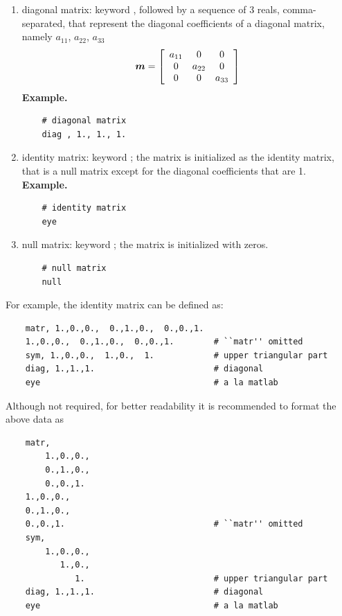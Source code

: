 \begin{enumerate}
    \item diagonal matrix: keyword , followed by a sequence
    of 3 reals, comma-separated, that represent the diagonal coefficients 
    of a diagonal matrix, namely $a_{11}$, $a_{22}$, $a_{33}$
\begin{equation}
	\T{m} = \sqbr{\matr{ccc}{
		a_{11} & 0 & 0 \\
		0 & a_{22} & 0 \\
		0 & 0 & a_{33}
	}}
\end{equation}
\textbf{Example.}
\begin{verbatim}
    # diagonal matrix
    diag , 1., 1., 1.
\end{verbatim}

    \item identity matrix: keyword ; the matrix is initialized
    as the identity matrix, that is a null matrix except for the diagonal 
    coefficients that are 1.
\textbf{Example.}
\begin{verbatim}
    # identity matrix
    eye
\end{verbatim}

    \item null matrix: keyword ; the matrix is initialized 
    with zeros.
\begin{verbatim}
    # null matrix
    null 
\end{verbatim}

\end{enumerate}
For example, the identity matrix can be defined as:
\begin{verbatim}
    matr, 1.,0.,0.,  0.,1.,0.,  0.,0.,1.
    1.,0.,0.,  0.,1.,0.,  0.,0.,1.        # ``matr'' omitted
    sym, 1.,0.,0.,  1.,0.,  1.            # upper triangular part
    diag, 1.,1.,1.                        # diagonal
    eye                                   # a la matlab
\end{verbatim}
Although not required, for better readability it is recommended to format
the above data as
\begin{verbatim}
    matr,
        1.,0.,0.,
        0.,1.,0.,
        0.,0.,1.
    1.,0.,0.,
    0.,1.,0.,
    0.,0.,1.                              # ``matr'' omitted
    sym,
        1.,0.,0.,
           1.,0.,
              1.                          # upper triangular part
    diag, 1.,1.,1.                        # diagonal
    eye                                   # a la matlab
\end{verbatim}

